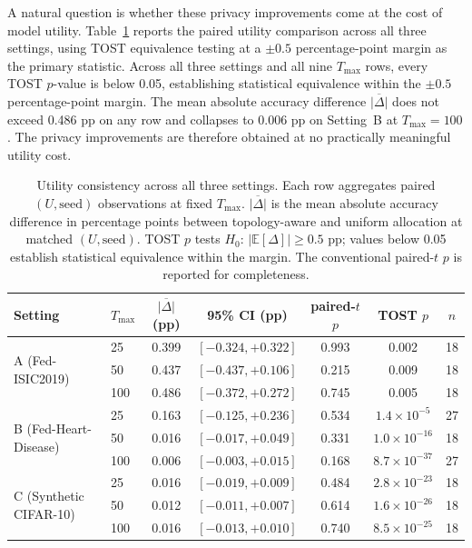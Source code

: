 \documentclass[letterpaper,journal]{IEEEtran}
\begin{document}
A natural question is whether these privacy improvements come at the
cost of model utility. Table~\ref{tab:utility-all} reports the
paired utility comparison across all three settings, using TOST
equivalence testing at a $\pm 0.5$ percentage-point margin as the
primary statistic. Across all three settings and all nine $T_{\max}$
rows, every TOST $p$-value is below 0.05, establishing statistical
equivalence within the $\pm 0.5$ percentage-point margin. The mean
absolute accuracy difference $\overline{|\Delta|}$ does not exceed
0.486 pp on any row and collapses to 0.006 pp on Setting~B at
$T_{\max} = 100$. The privacy improvements are therefore obtained at
no practically meaningful utility cost.

\begin{table}[t]
\centering
\caption{Utility consistency across all three settings. Each row
aggregates paired $(U, \mathrm{seed})$ observations at fixed
$T_{\max}$. $\overline{|\Delta|}$ is the mean absolute accuracy
difference in percentage points between topology-aware and uniform
allocation at matched $(U, \mathrm{seed})$. TOST $p$ tests $H_0$:
$|\mathbb{E}[\Delta]| \geq 0.5$ pp; values below 0.05 establish
statistical equivalence within the margin. The conventional
paired-$t$ $p$ is reported for completeness.}
\label{tab:utility-all}
\begin{tabular}{@{}llccccc@{}}
\toprule
Setting & $T_{\max}$ & $\overline{|\Delta|}$ (pp) & 95\% CI (pp) &
paired-$t$ $p$ & TOST $p$ & $n$ \\
\midrule
\multirow{3}{*}{A (Fed-ISIC2019)}
& 25  & 0.399 & $[-0.324, +0.322]$ & 0.993 & 0.002 & 18 \\
& 50  & 0.437 & $[-0.437, +0.106]$ & 0.215 & 0.009 & 18 \\
& 100 & 0.486 & $[-0.372, +0.272]$ & 0.745 & 0.005 & 18 \\
\midrule
\multirow{3}{*}{B (Fed-Heart-Disease)}
& 25  & 0.163 & $[-0.125, +0.236]$ & 0.534 & $1.4\times10^{-5}$ & 27 \\
& 50  & 0.016 & $[-0.017, +0.049]$ & 0.331 & $1.0\times10^{-16}$ & 18 \\
& 100 & 0.006 & $[-0.003, +0.015]$ & 0.168 & $8.7\times10^{-37}$ & 27 \\
\midrule
\multirow{3}{*}{C (Synthetic CIFAR-10)}
& 25  & 0.016 & $[-0.019, +0.009]$ & 0.484 & $2.8\times10^{-23}$ & 18 \\
& 50  & 0.012 & $[-0.011, +0.007]$ & 0.614 & $1.6\times10^{-26}$ & 18 \\
& 100 & 0.016 & $[-0.013, +0.010]$ & 0.740 & $8.5\times10^{-25}$ & 18 \\
\bottomrule
\end{tabular}
\end{table}
\end{document}
